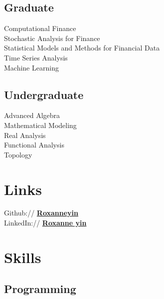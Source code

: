 \documentclass[letterpaper]{deedy-resume} %
\begin{document}
\begin{minipage}[t]{0.33\textwidth}
\subsection{Graduate}


Computational Finance\\
Stochastic Analysis for Finance\\
Statistical Models and Methods for Financial Data\\
Time Series Analysis\\
Machine Learning\\

\sectionspace %


\subsection{Undergraduate}

Advanced Algebra\\
Mathematical Modeling\\
Real Analysis\\
Functional Analysis\\
Topology\\

\sectionspace %


\section{Links}

Github:// \href{https://github.com/Roxanneyin}{\bf Roxanneyin} \\
LinkedIn:// \href{https://www.linkedin.com/in/roxanne-yin-1010/}{\bf Roxanne yin} \\

\sectionspace %



\section{Skills}

\subsection{Programming}


\end{minipage}
\end{document}
